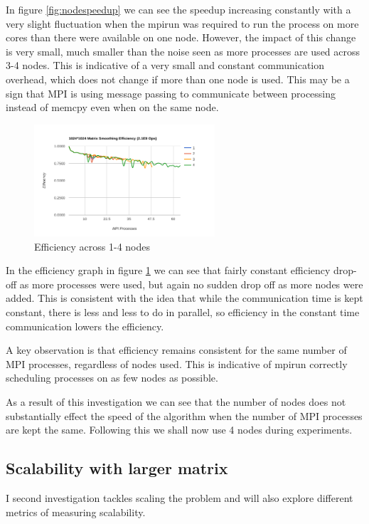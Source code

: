 \documentclass[a4paper,10pt]{report}
\begin{document}
In figure \ref{fig:nodespeedup} we can see the speedup increasing constantly with a very slight fluctuation when the mpirun was required to run the process on more cores than there were available on one node. However, the impact of this change is very small, much smaller than the noise seen as more processes are used across 3-4 nodes. This is indicative of a very small and constant communication overhead, which does not change if more than one node is used. This may be a sign that MPI is using message passing to communicate between processing instead of memcpy even when on the same node.

\begin{figure}
 \centering
 \includegraphics[width=0.6\textwidth]{./images/nodes-efficiency.png}
 \caption{Efficiency across 1-4 nodes}
 \label{fig:nodeefficiency}
\end{figure}

In the efficiency graph in figure \ref{fig:nodeefficiency} we can see that fairly constant efficiency drop-off as more processes were used, but again no sudden drop off as more nodes were added. This is consistent with the idea that while the communication time is kept constant, there is less and less to do in parallel, so efficiency in the constant time communication lowers the efficiency.

A key observation is that efficiency remains consistent for the same number of MPI processes, regardless of nodes used. This is indicative of mpirun correctly scheduling processes on as few nodes as possible.

As a result of this investigation we can see that the number of nodes does not substantially effect the speed of the algorithm when the number of MPI processes are kept the same. Following this we shall now use 4 nodes during experiments.

\subsection{Scalability with larger matrix}
I second investigation tackles scaling the problem and will also explore different metrics of measuring scalability.
\end{document}
